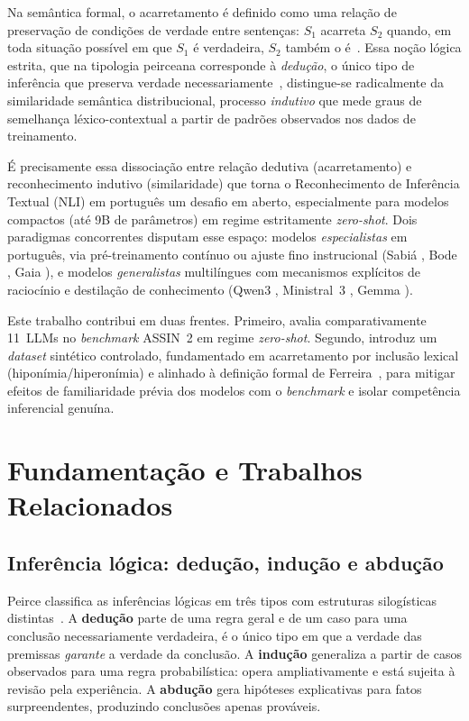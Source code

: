 \documentclass[12pt]{article}
\begin{document}
Na semântica formal, o acarretamento é definido como uma relação de preservação
de condições de verdade entre sentenças: $S_1$ acarreta $S_2$ quando, em toda
situação possível em que $S_1$ é verdadeira, $S_2$ também o
é~\cite{Ferreira2019}. Essa noção lógica estrita, que na tipologia peirceana
corresponde à \emph{dedução}, o único tipo de inferência que preserva verdade
necessariamente~\cite{peirce_cp2}, distingue-se radicalmente da similaridade
semântica distribucional, processo \emph{indutivo} que mede graus de semelhança
léxico-contextual a partir de padrões observados nos dados de treinamento.

É precisamente essa dissociação entre relação dedutiva (acarretamento) e
reconhecimento indutivo (similaridade) que torna o Reconhecimento de Inferência
Textual (NLI) em português um desafio em aberto, especialmente para modelos
compactos (até 9B de parâmetros) em regime estritamente \emph{zero-shot}. Dois
paradigmas concorrentes disputam esse espaço: modelos \emph{especialistas} em
português, via pré-treinamento contínuo ou ajuste fino instrucional (Sabiá
\cite{Pires_2023_sabia}, Bode \cite{bode2024}, Gaia
\cite{gaia-gemma-3-4b-2025}), e modelos \emph{generalistas} multilíngues com
mecanismos explícitos de raciocínio e destilação de conhecimento (Qwen3
\cite{yang2025qwen3technicalreport}, Ministral~3 \cite{liu2026ministral3},
Gemma \cite{gemmateam2024gemma2improvingopen}).

Este trabalho contribui em duas frentes. Primeiro, avalia comparativamente
11~LLMs no \emph{benchmark} ASSIN~2 \cite{real2020assin} em regime
\emph{zero-shot}. Segundo, introduz um \emph{dataset} sintético controlado,
fundamentado em acarretamento por inclusão lexical (hiponímia/hiperonímia) e
alinhado à definição formal de Ferreira~\cite{Ferreira2019}, para mitigar
efeitos de familiaridade prévia dos modelos com o \emph{benchmark} e isolar
competência inferencial genuína.

\section{Fundamentação e Trabalhos Relacionados}

\subsection{Inferência lógica: dedução, indução e abdução}

Peirce classifica as inferências lógicas em três tipos com estruturas
silogísticas distintas~\cite{peirce_cp2,peirce_cp5}. A \textbf{dedução} parte
de uma regra geral e de um caso para uma conclusão necessariamente verdadeira, é o único tipo em que a verdade das premissas \emph{garante} a verdade da
conclusão. A \textbf{indução} generaliza a partir de casos observados para uma
regra probabilística: opera ampliativamente e está sujeita à revisão pela
experiência. A \textbf{abdução} gera hipóteses explicativas para fatos
surpreendentes, produzindo conclusões apenas prováveis.
\end{document}
